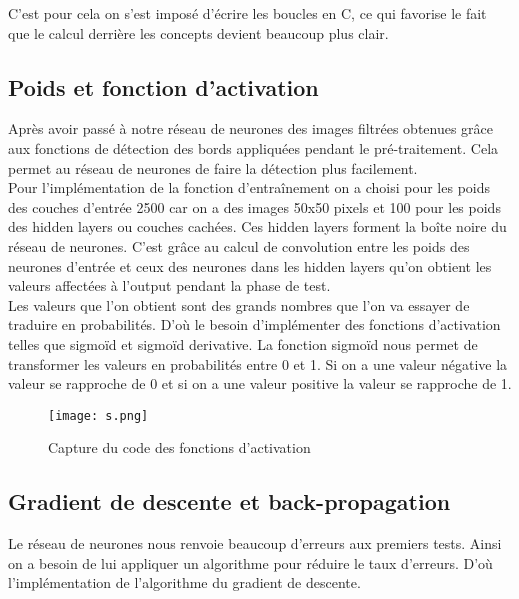 \documentclass[a4paper,11pt]{report}
\theoremstyle{definition}
\begin{document}
C’est pour cela on s’est imposé d'écrire les boucles en C, ce qui favorise le fait que le calcul derrière les concepts devient beaucoup plus clair.






\subsection{Poids et fonction d'activation}
Après avoir passé à notre réseau de neurones des images filtrées obtenues grâce aux fonctions de détection des bords appliquées pendant le pré-traitement. Cela permet au réseau de neurones de faire la détection plus facilement.\\

Pour l'implémentation de la fonction d'entraînement on a
choisi pour les poids des couches d'entrée 2500 car on a des images 50x50 pixels et 100 pour les poids des hidden layers ou couches cachées. Ces hidden layers forment la boîte noire du réseau de neurones. C'est grâce au calcul de convolution entre les poids des neurones d’entrée et ceux des neurones dans les hidden layers qu'on obtient les valeurs affectées à l'output pendant la phase de test. \\

Les valeurs que l'on obtient sont des grands nombres que l'on va essayer de traduire en probabilités. D'où le besoin d'implémenter des fonctions d'activation telles que sigmoïd et sigmoïd
derivative. La fonction sigmoïd nous permet de transformer les valeurs en probabilités entre 0 et 1. Si on a une valeur négative la valeur se rapproche de 0 et si on a une valeur positive la valeur se rapproche de 1.

 \begin{figure}[!htbp]
   \begin{center}
   \texttt{[image: s.png]}
   \caption{Capture du code des fonctions d'activation }
   \end{center}
   \end{figure}



\subsection{Gradient de descente et back-propagation}

Le réseau de neurones nous renvoie beaucoup d'erreurs aux premiers tests. Ainsi on a besoin de lui appliquer un algorithme pour réduire le taux d'erreurs. D'où l'implémentation de l'algorithme du gradient de descente. \\
\end{document}
